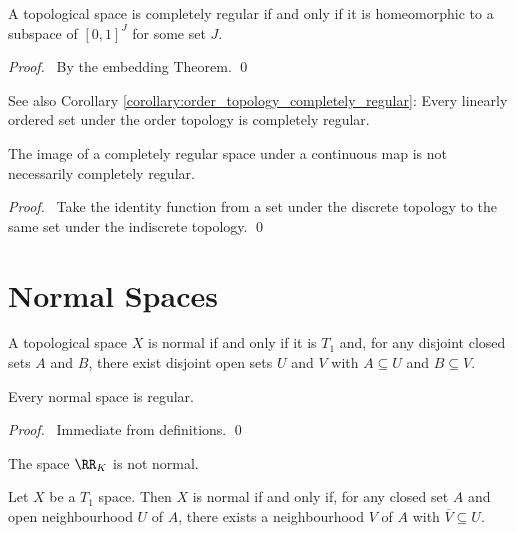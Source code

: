 \begin{theorem}
    \label{theorem:completely_regular_embedded_in_IJ}
    A topological space is completely regular if and only if it is homeomorphic to
    a subspace of $[0,1]^J$ for some set $J$.
\end{theorem}

\begin{proof}
    \pf\ By the embedding Theorem. \qed
\end{proof}

See also Corollary \ref{corollary:order_topology_completely_regular}: Every linearly ordered set under the
order topology is completely regular.

\begin{proposition}
    The image of a completely regular space under a continuous map is
    not necessarily completely regular.
\end{proposition}

\begin{proof}
    \pf\ Take the identity function from a set under the
    discrete topology to the same set under the indiscrete topology. \qed
\end{proof}

\section{Normal Spaces}

\begin{definition}[Normal]
    A topological space $X$ is normal if and only if it is $T_1$ and, for any
    disjoint closed sets $A$ and $B$, there exist disjoint open sets $U$ and $V$
    with $A \subseteq U$ and $B \subseteq V$.
\end{definition}

\begin{proposition}
    Every normal space is regular.
\end{proposition}

\begin{proof}
    \pf\ Immediate from definitions. \qed
\end{proof}

\begin{corollary}
    The space $\RR_K$ is not normal.
\end{corollary}

\begin{proposition}
    \label{proposition:normal_neighbourhoods}
    Let $X$ be a $T_1$ space. Then $X$ is normal if and only if, for any closed
    set $A$ and open neighbourhood $U$ of $A$, there exists a neighbourhood
    $V$ of $A$ with $\overline{V} \subseteq U$.
\end{proposition}

